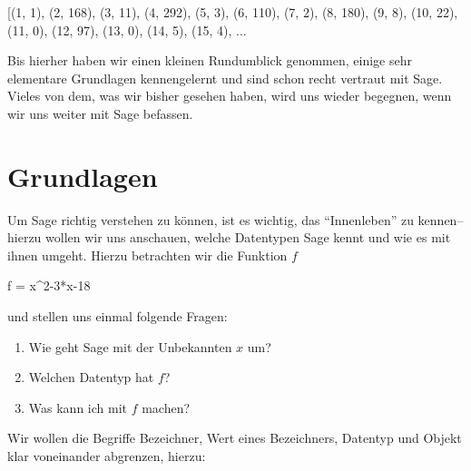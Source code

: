 \documentclass[fontsize=12pt,paper=a4,twoside,bibtotoc,idxtotoc,
liststotoc,pagesize,BCOR1.2cm,DIV15,chapterprefix,pagesize=pdftex]{scrbook}
\theoremstyle{plain}
\theoremstyle{definition}
\theoremstyle{remark}
\begin{document}
\begin{sage}
[(1, 1), (2, 168), (3, 11), (4, 292), (5, 3), (6, 110), (7, 2), (8,
180), (9, 8), (10, 22), (11, 0), (12, 97), (13, 0), (14, 5), (15, 4),
...
\end{sage}
Bis hierher haben wir einen kleinen Rundumblick genommen, einige sehr elementare Grundlagen kennengelernt und sind schon recht vertraut mit 
Sage. Vieles von dem, was wir bisher gesehen haben, wird uns wieder begegnen, wenn wir uns weiter mit Sage befassen.
\chapter{Grundlagen}
Um Sage richtig verstehen zu können, ist es wichtig, das ``Innenleben'' zu kennen-- hierzu wollen wir uns anschauen, welche Datentypen Sage 
kennt und wie es mit ihnen umgeht. Hierzu betrachten wir die Funktion $f$
\begin{sagein}
f = x^2-3*x-18
\end{sagein}
und stellen uns einmal folgende Fragen:
\begin{enumerate}
 \item Wie geht Sage mit der Unbekannten $x$ um?
 \item Welchen Datentyp hat $f$?
 \item Was kann ich mit $f$ machen?
\end{enumerate}
Wir wollen die Begriffe Bezeichner, Wert eines Bezeichners, Datentyp und Objekt klar voneinander abgrenzen, hierzu:
\end{document}
